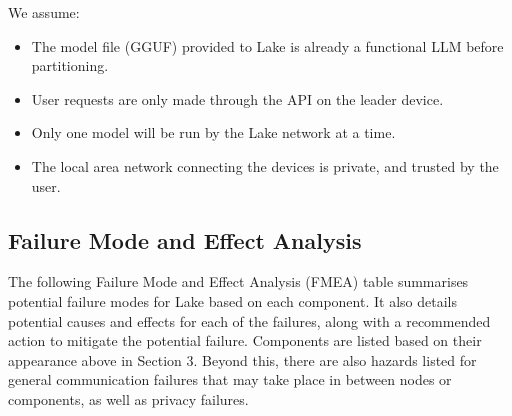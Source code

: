 \documentclass{article}
\begin{document}
We assume:
\begin{itemize}
	\item The model file (GGUF) provided to Lake is already a functional LLM before partitioning.
	\item User requests are only made through the API on the leader device.
	\item Only one model will be run by the Lake network at a time.
	\item The local area network connecting the devices is private, and trusted by the user.
\end{itemize}

\begin{landscape}
\section{Failure Mode and Effect Analysis}
\label{SecFMEA}

The following Failure Mode and Effect Analysis (FMEA) table summarises potential failure modes for Lake based on each component.
It also details potential causes and effects for each of the failures, along with a recommended action to mitigate
the potential failure. Components are listed based on their appearance above in Section 3. Beyond this, there are also
hazards listed for general communication failures that may take place in between nodes or components, as well as privacy failures.


\end{landscape}
\end{document}
